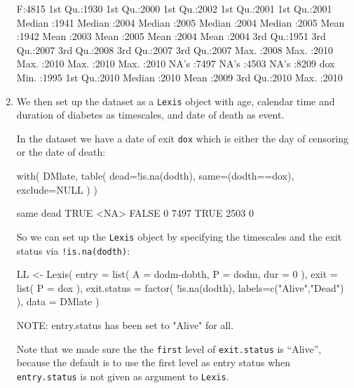 \begin{enumerate}
\begin{Schunk}
\begin{Soutput}
 F:4815   1st Qu.:1930   1st Qu.:2000   1st Qu.:2002   1st Qu.:2001   1st Qu.:2001  
          Median :1941   Median :2004   Median :2005   Median :2004   Median :2005  
          Mean   :1942   Mean   :2003   Mean   :2005   Mean   :2004   Mean   :2004  
          3rd Qu.:1951   3rd Qu.:2007   3rd Qu.:2008   3rd Qu.:2007   3rd Qu.:2007  
          Max.   :2008   Max.   :2010   Max.   :2010   Max.   :2010   Max.   :2010  
                                        NA's   :7497   NA's   :4503   NA's   :8209  
      dox      
 Min.   :1995  
 1st Qu.:2010  
 Median :2010  
 Mean   :2009  
 3rd Qu.:2010  
 Max.   :2010  
\end{Soutput}
\end{Schunk}


\item We then set up the dataset as a \texttt{Lexis} object with age, calendar
  time and duration of diabetes as timescales, and date of death as
  event.

  In the dataset we have a date of exit \texttt{dox} which is either
  the day of censoring or the date of death:
\begin{Schunk}
\begin{Sinput}
 with( DMlate, table( dead=!is.na(dodth),
                      same=(dodth==dox), exclude=NULL ) )
\end{Sinput}
\begin{Soutput}
       same
dead    TRUE <NA>
  FALSE    0 7497
  TRUE  2503    0
\end{Soutput}
\end{Schunk}
  So we can set up the \texttt{Lexis} object by specifying the
  timescales and the exit status via \texttt{!is.na(dodth)}:
\begin{Schunk}
\begin{Sinput}
 LL <- Lexis( entry = list( A = dodm-dobth,
                            P = dodm,
                          dur = 0 ),
               exit = list( P = dox ),
        exit.status = factor( !is.na(dodth),
                              labels=c("Alive","Dead") ),
               data = DMlate )
\end{Sinput}
\begin{Soutput}
NOTE: entry.status has been set to "Alive" for all.
\end{Soutput}
\end{Schunk}
Note that we made sure the the \texttt{first} level of
\texttt{exit.status} is ``Alive'', because the default is to use the
first level as entry status when \texttt{entry.status} is not given as
argument to \texttt{Lexis}.


\end{enumerate}
